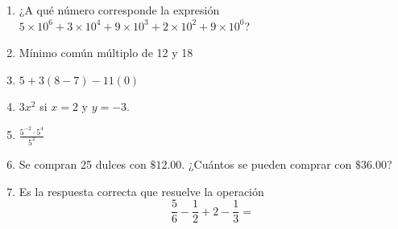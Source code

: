 \documentclass{article}
\begin{document}
\begin{enumerate}
    \item ¿A qué número corresponde la expresión \(5\times 10^6 + 3\times 10^4 + 9\times 10^3 + 2\times 10^2 + 9\times 10^0\)?
    \item Mínimo común múltiplo de 12 y 18
    \item \(5 + 3(8 - 7) - 11(0)\)
    \item \(3x^2\) si \(x = 2\) y \(y = -3\).
    \item \(\frac{5^{-2}\cdot5^4}{5^2}\)
    \item Se compran 25 dulces con \(\mathdollar 12.00\). ¿Cuántos se pueden comprar con \(\mathdollar 36.00\)?
    \item Es la respuesta correcta que resuelve la operación \[\frac{5}{6} - \frac{1}{2} + 2 - \frac{1}{3} = \]
\end{enumerate}
\end{document}
